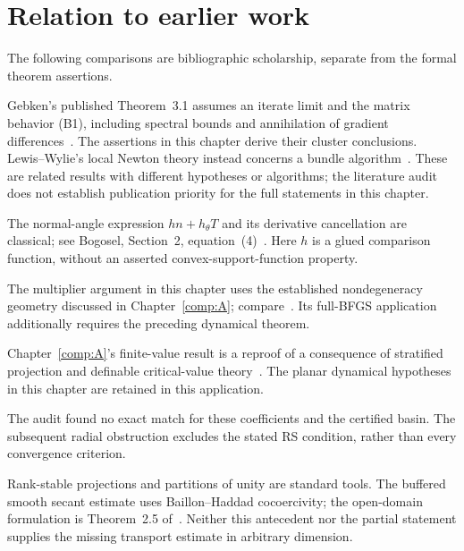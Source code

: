 \endgroup


\section*{Relation to earlier work}
The following comparisons are bibliographic scholarship, separate from the formal theorem assertions.

Gebken's published Theorem~3.1 assumes an iterate limit and the matrix behavior (B1), including spectral bounds and annihilation of gradient differences~\cite{BG}. The assertions in this chapter derive their cluster conclusions. Lewis--Wylie's local Newton theory instead concerns a bundle algorithm~\cite{LW}. These are related results with different hypotheses or algorithms; the literature audit does not establish publication priority for the full statements in this chapter.

The normal-angle expression $h n+h_\theta T$ and its derivative cancellation are classical; see Bogosel, Section~2, equation~(4)~\cite{geom_Bogosel2023}. Here $h$ is a glued comparison function, without an asserted convex-support-function property.

The multiplier argument in this chapter uses the established nondegeneracy geometry discussed in Chapter~\ref{comp:A}; compare~\cite{LW,BG}. Its full-BFGS application additionally requires the preceding dynamical theorem.

Chapter~\ref{comp:A}'s finite-value result is a reproof of a consequence of stratified projection and definable critical-value theory~\cite{BDLS}. The planar dynamical hypotheses in this chapter are retained in this application.

The audit found no exact match for these coefficients and the certified basin. The subsequent radial obstruction excludes the stated RS condition, rather than every convergence criterion.

Rank-stable projections and partitions of unity are standard tools. The buffered smooth secant estimate uses Baillon--Haddad cocoercivity; the open-domain formulation is Theorem~2.5 of~\cite{WW}. Neither this antecedent nor the partial statement supplies the missing transport estimate in arbitrary dimension.
